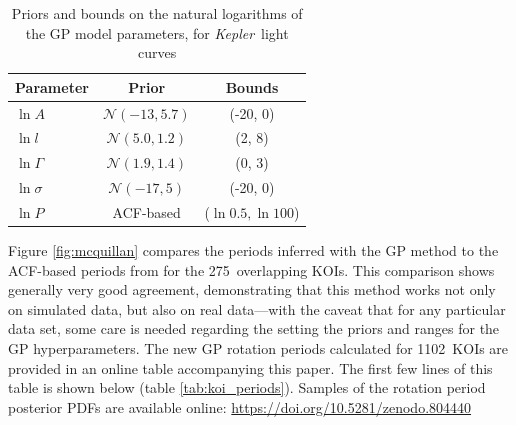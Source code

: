 \documentclass[a4paper,fleqn,usenatbib,useAMS]{mnras}
\newcommand{\response}[1]{{#1}}
\newcommand{\Kepler}{{\it Kepler}}
\newcommand{\nkoi}{1102}
\newcommand{\nkoimcq}{275}
\begin{document}
\begin{table}
\begin{center}
\caption{\label{tab:koipriors} Priors and bounds on the natural logarithms of
    the GP model parameters, for \Kepler\ light curves}
\begin{tabular}{lcc}
Parameter & Prior & Bounds\\
    \hline
    $\ln A$ & $\mathcal N(-13, 5.7)$ & (-20, 0) \\
    $\ln l$ & $\mathcal N(5.0, 1.2)$ & (2, 8) \\
    $\ln \Gamma$ & $\mathcal N(1.9, 1.4)$ & (0, 3) \\
    $\ln \sigma$ & $\mathcal N(-17, 5)$ & (-20, 0) \\
    $\ln P $ & ACF-based & ($\ln 0.5, \ln 100$) \\
\end{tabular}
\end{center}
\end{table}

Figure \ref{fig:mcquillan} compares the periods inferred with the GP method to
the ACF-based periods from \citet{Mcquillan2013} for the \nkoimcq\ overlapping
KOIs.
This comparison shows generally very good agreement, demonstrating that this
method works not only on simulated data, but also on real data---with the
caveat that for any particular data set, some care is needed regarding the
setting the priors and ranges for the GP hyperparameters.
\response{The new GP rotation periods calculated for \nkoi\ KOIs are provided in an
online table accompanying this paper.
The first few lines of this table is shown below
(table \ref{tab:koi_periods}).
Samples of the rotation period posterior PDFs are available online:
\url{https://doi.org/10.5281/zenodo.804440}}
\end{document}
